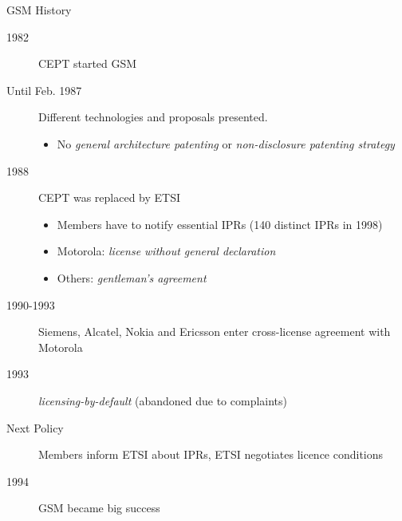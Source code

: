 \begin{frame}{GSM History}
  \begin{description}
    \item[1982] CEPT started GSM %
    \item[Until Feb. 1987] Different technologies and proposals presented.
    \begin{itemize}
      \item No \emph{general architecture patenting} or \emph{non-disclosure patenting strategy}
    \end{itemize}
    \item[1988] CEPT was replaced by ETSI %
    \begin{itemize}
      \item Members have to notify essential IPRs (140 distinct IPRs in 1998)
      \item Motorola: \emph{license without general declaration}
      \item Others: \emph{gentleman's agreement}
    \end{itemize}
    \item[1990-1993] Siemens, Alcatel, Nokia and Ericsson enter cross-license agreement with Motorola
    \item[1993] \emph{licensing-by-default} (abandoned due to complaints)
    \item[Next Policy] Members inform ETSI about IPRs, ETSI negotiates licence conditions
    \item[1994] GSM became big success
  \end{description}
\end{frame}
